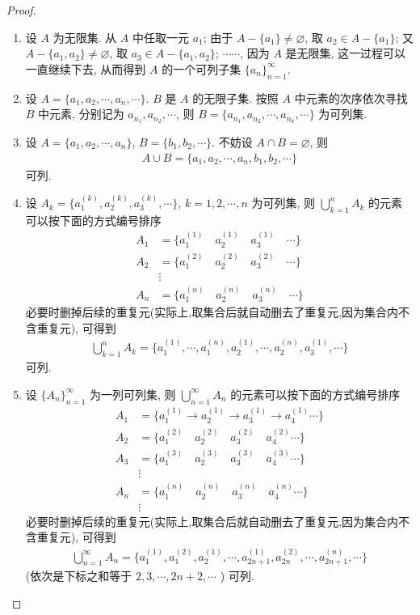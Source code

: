 \documentclass[../../main.tex]{subfiles}
\begin{document}
\begin{proof}
\begin{enumerate}[(1)]
\item 设 $A$ 为无限集. 从 $A$ 中任取一元 $a_1$; 由于 $A - \{a_1\} \neq \varnothing$, 取 $a_2 \in A - \{a_1\}$; 又 $A - \{a_1, a_2\} \neq \varnothing$, 取 $a_3 \in A - \{a_1, a_2\}$; $\cdots\cdots$, 因为 $A$ 是无限集, 这一过程可以一直继续下去, 从而得到 $A$ 的一个可列子集 $\{a_n\}_{n = 1}^{\infty}$.

\item 设 $A = \{a_1, a_2, \cdots, a_n, \cdots\}$. $B$ 是 $A$ 的无限子集. 按照 $A$ 中元素的次序依次寻找 $B$ 中元素, 分别记为 $a_{n_1}, a_{n_2}, \cdots$, 则 $B = \{a_{n_1}, a_{n_2}, \cdots, a_{n_k}, \cdots\}$ 为可列集.

\item 设 $A = \{a_1, a_2, \cdots, a_n\}$, $B = \{b_1, b_2, \cdots\}$. 不妨设 $A \cap B = \varnothing$, 则
\begin{align*}
A \cup B = \{a_1, a_2, \cdots, a_n, b_1, b_2, \cdots\}
\end{align*}
可列.

\item 设 $A_k = \{a_1^{(k)}, a_2^{(k)}, a_3^{(k)}, \cdots\}$, $k = 1, 2, \cdots, n$ 为可列集, 则 $\bigcup_{k = 1}^{n} A_k$ 的元素可以按下面的方式编号排序
\begin{align*}
A_1 &= \{a_1^{(1)} \quad a_2^{(1)} \quad a_3^{(1)} \quad \cdots\}\\
A_2 &= \{a_1^{(2)} \quad a_2^{(2)} \quad a_3^{(2)} \quad \cdots\}\\
&\vdots\\
A_n &= \{a_1^{(n)} \quad a_2^{(n)} \quad a_3^{(n)} \quad \cdots\}
\end{align*}
必要时删掉后续的重复元(实际上,取集合后就自动删去了重复元,因为集合内不含重复元), 可得到
\begin{align*}
\bigcup_{k = 1}^{n} A_k = \{a_1^{(1)}, \cdots, a_1^{(n)}, a_2^{(1)}, \cdots, a_2^{(n)}, a_3^{(1)}, \cdots\}
\end{align*}
可列.

\item 设 $\{A_n\}_{n = 1}^{\infty}$ 为一列可列集, 则 $\bigcup_{n = 1}^{\infty} A_n$ 的元素可以按下面的方式编号排序
\begin{align*}
A_1 &= \{a_1^{(1)} \to a_2^{(1)} \to a_3^{(1)} \to a_4^{(1)} \cdots\}\\
A_2 &= \{a_1^{(2)} \quad a_2^{(2)} \quad a_3^{(2)} \quad a_4^{(2)} \cdots\}\\
A_3 &= \{a_1^{(3)} \quad a_2^{(3)} \quad a_3^{(3)} \quad a_4^{(3)} \cdots\}\\
&\vdots\\
A_n &= \{a_1^{(n)} \quad a_2^{(n)} \quad a_3^{(n)} \quad a_4^{(n)} \cdots\}\\
&\vdots
\end{align*}
必要时删掉后续的重复元(实际上,取集合后就自动删去了重复元,因为集合内不含重复元), 可得到
\begin{align*}
\bigcup_{n = 1}^{\infty} A_n = \{a_1^{(1)}, a_1^{(2)}, a_2^{(1)}, \cdots, a_{2n + 1}^{(1)}, a_{2n}^{(2)}, \cdots, a_{2n + 1}^{(n)}, \cdots\}
\end{align*}
(依次是下标之和等于 $2, 3, \cdots, 2n + 2, \cdots$ ) 可列.



\end{enumerate}
\end{proof}
\end{document}
